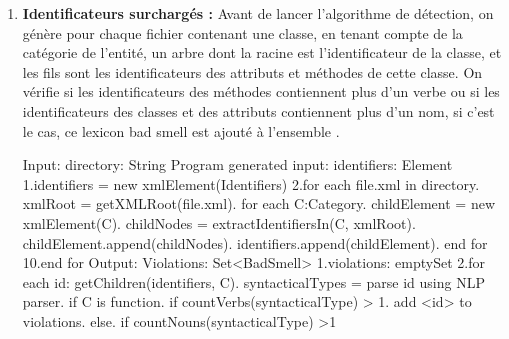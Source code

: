 \begin{enumerate}
\newline
\item \textbf {	Identificateurs surchargés :}
Avant de lancer l'algorithme de détection, on génère pour chaque fichier contenant une classe, en tenant compte de la catégorie de l'entité, un arbre dont la racine est l'identificateur de la classe, et les fils sont les identificateurs des attributs et méthodes de cette classe.
\newline
On vérifie si les identificateurs des méthodes contiennent plus d'un verbe  ou si les identificateurs des classes et des attributs contiennent plus d'un nom, si c'est le cas, ce lexicon bad smell est ajouté à l'ensemble \cite{abebe2009lexicon}.
\begin{framed}
  {\selectfont  
Input:\newline
 directory: String\newline
 Program generated input:\newline
 identifiers: Element\newline
 1.identifiers = new xmlElement(Identifiers)\newline
 2.for each file.xml in directory.	xmlRoot = getXMLRoot(file.xml).	for each C:Category.		childElement = new xmlElement(C).		childNodes = extractIdentifiersIn(C, xmlRoot).		childElement.append(childNodes).		identifiers.append(childElement).	end for\newline
 10.end for\newline
 Output:\newline
 Violations: Set<BadSmell>\newline
 1.violations: emptySet\newline
 2.for each id: getChildren(identifiers, C).	syntacticalTypes = parse id using NLP parser.	if C is function.		if countVerbs(syntacticalType) > 1. 			add <id> to violations.	 else.		if countNouns(syntacticalType) >1\newline
}
\end{framed}
\end{enumerate}
